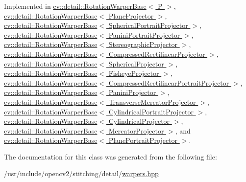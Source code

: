 Implemented in \hyperlink{classcv_1_1detail_1_1RotationWarperBase_a6d1e3fa225896a69be90272f699648ba}{cv\-::detail\-::\-Rotation\-Warper\-Base$<$ P $>$}, \hyperlink{classcv_1_1detail_1_1RotationWarperBase_a6d1e3fa225896a69be90272f699648ba}{cv\-::detail\-::\-Rotation\-Warper\-Base$<$ Plane\-Projector $>$}, \hyperlink{classcv_1_1detail_1_1RotationWarperBase_a6d1e3fa225896a69be90272f699648ba}{cv\-::detail\-::\-Rotation\-Warper\-Base$<$ Spherical\-Portrait\-Projector $>$}, \hyperlink{classcv_1_1detail_1_1RotationWarperBase_a6d1e3fa225896a69be90272f699648ba}{cv\-::detail\-::\-Rotation\-Warper\-Base$<$ Panini\-Portrait\-Projector $>$}, \hyperlink{classcv_1_1detail_1_1RotationWarperBase_a6d1e3fa225896a69be90272f699648ba}{cv\-::detail\-::\-Rotation\-Warper\-Base$<$ Stereographic\-Projector $>$}, \hyperlink{classcv_1_1detail_1_1RotationWarperBase_a6d1e3fa225896a69be90272f699648ba}{cv\-::detail\-::\-Rotation\-Warper\-Base$<$ Compressed\-Rectilinear\-Projector $>$}, \hyperlink{classcv_1_1detail_1_1RotationWarperBase_a6d1e3fa225896a69be90272f699648ba}{cv\-::detail\-::\-Rotation\-Warper\-Base$<$ Spherical\-Projector $>$}, \hyperlink{classcv_1_1detail_1_1RotationWarperBase_a6d1e3fa225896a69be90272f699648ba}{cv\-::detail\-::\-Rotation\-Warper\-Base$<$ Fisheye\-Projector $>$}, \hyperlink{classcv_1_1detail_1_1RotationWarperBase_a6d1e3fa225896a69be90272f699648ba}{cv\-::detail\-::\-Rotation\-Warper\-Base$<$ Compressed\-Rectilinear\-Portrait\-Projector $>$}, \hyperlink{classcv_1_1detail_1_1RotationWarperBase_a6d1e3fa225896a69be90272f699648ba}{cv\-::detail\-::\-Rotation\-Warper\-Base$<$ Panini\-Projector $>$}, \hyperlink{classcv_1_1detail_1_1RotationWarperBase_a6d1e3fa225896a69be90272f699648ba}{cv\-::detail\-::\-Rotation\-Warper\-Base$<$ Transverse\-Mercator\-Projector $>$}, \hyperlink{classcv_1_1detail_1_1RotationWarperBase_a6d1e3fa225896a69be90272f699648ba}{cv\-::detail\-::\-Rotation\-Warper\-Base$<$ Cylindrical\-Portrait\-Projector $>$}, \hyperlink{classcv_1_1detail_1_1RotationWarperBase_a6d1e3fa225896a69be90272f699648ba}{cv\-::detail\-::\-Rotation\-Warper\-Base$<$ Cylindrical\-Projector $>$}, \hyperlink{classcv_1_1detail_1_1RotationWarperBase_a6d1e3fa225896a69be90272f699648ba}{cv\-::detail\-::\-Rotation\-Warper\-Base$<$ Mercator\-Projector $>$}, and \hyperlink{classcv_1_1detail_1_1RotationWarperBase_a6d1e3fa225896a69be90272f699648ba}{cv\-::detail\-::\-Rotation\-Warper\-Base$<$ Plane\-Portrait\-Projector $>$}.



The documentation for this class was generated from the following file\-:\begin{DoxyCompactItemize}
\item 
/usr/include/opencv2/stitching/detail/\hyperlink{detail_2warpers_8hpp}{warpers.\-hpp}\end{DoxyCompactItemize}
